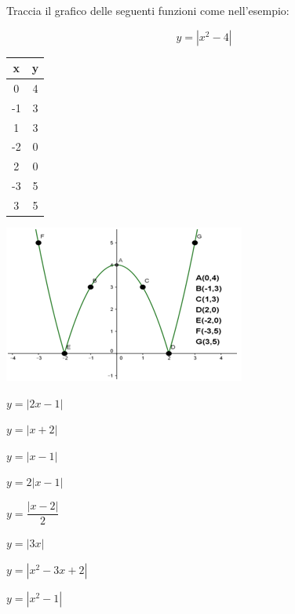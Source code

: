 \begin{esercizio}\label{ese:03.1}
Traccia il grafico delle seguenti funzioni come nell'esempio:

\noindent\begin{minipage}{.40\textwidth}
\[y=|x^2-4|\]
\begin{tabular}{|c|c|}
        \hline
        x & y \\
        \hline
        0 & 4 \\
        \hline  
        -1 & 3 \\
        \hline
        1 & 3 \\
        \hline
        -2 & 0 \\
        \hline
        2 & 0 \\
        \hline
        -3 & 5 \\
        \hline
        3 & 5 \\
        \hline                                                  
\end{tabular} 
\end{minipage}
\hfill
\begin{minipage}{.58\textwidth}
\begin{inaccessibleblock}[TODO]
\centering
\includegraphics[width=0.9\linewidth]{img/imm7} 
\end{inaccessibleblock}
\end{minipage}

\begin{multicols}{4}
\begin{enumeratea}
        \item \(y=|2x-1|\)
        \item \(y=|x+2|\)
        \item \(y=|x-1|\)
        \item \(y=2|x-1|\)
        \item \(y=\dfrac{|x-2|}{2}\)
        \item \(y=|3x|\)
        \item \(y=|x^2-3x+2|\)
        \item \(y=|x^2-1|\)
\end{enumeratea}
\end{multicols}
\end{esercizio}

